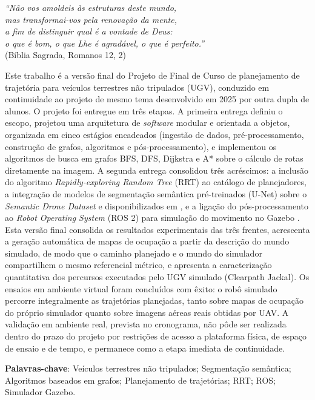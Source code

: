 \documentclass[
    12pt,
    openright,
    oneside,
    a4paper,
    english,
    brazil
]{abntex2}
\begin{document}
\begin{epigrafe}
    \vspace*{\fill}
    \begin{flushright}
        \textit{``Não vos amoldeis às estruturas deste mundo,\\
        mas transformai-vos pela renovação da mente,\\
        a fim de distinguir qual é a vontade de Deus:\\
        o que é bom, o que Lhe é agradável, o que é perfeito.''}\\
        (Bíblia Sagrada, Romanos 12, 2)
    \end{flushright}
\end{epigrafe}

\setlength{\absparsep}{18pt}
\begin{resumo}
Este trabalho é a versão final do Projeto de Final de Curso de planejamento de trajetória para veículos terrestres não tripulados (UGV), conduzido em continuidade ao projeto de mesmo tema desenvolvido em 2025 por outra dupla de alunos. O projeto foi entregue em três etapas. A primeira entrega definiu o escopo, projetou uma arquitetura de \textit{software} modular e orientada a objetos, organizada em cinco estágios encadeados (ingestão de dados, pré-processamento, construção de grafos, algoritmos e pós-processamento), e implementou os algoritmos de busca em grafos BFS, DFS, Dijkstra e A* sobre o cálculo de rotas diretamente na imagem. A segunda entrega consolidou três acréscimos: a inclusão do algoritmo \textit{Rapidly-exploring Random Tree} (RRT) ao catálogo de planejadores, a integração de modelos de segmentação semântica pré-treinados (U-Net) sobre o \textit{Semantic Drone Dataset} \cite{drone_dataset} e disponibilizados em \cite{junior2024_models}, e a ligação do pós-processamento ao \textit{Robot Operating System} (ROS 2) \cite{quigley2009} para simulação do movimento no Gazebo \cite{koenig2004}. Esta versão final consolida os resultados experimentais das três frentes, acrescenta a geração automática de mapas de ocupação a partir da descrição do mundo simulado, de modo que o caminho planejado e o mundo do simulador compartilhem o mesmo referencial métrico, e apresenta a caracterização quantitativa dos percursos executados pelo UGV simulado (Clearpath Jackal). Os ensaios em ambiente virtual foram concluídos com êxito: o robô simulado percorre integralmente as trajetórias planejadas, tanto sobre mapas de ocupação do próprio simulador quanto sobre imagens aéreas reais obtidas por UAV. A validação em ambiente real, prevista no cronograma, não pôde ser realizada dentro do prazo do projeto por restrições de acesso a plataforma física, de espaço de ensaio e de tempo, e permanece como a etapa imediata de continuidade.

\textbf{Palavras-chave}: Veículos terrestres não tripulados; Segmentação semântica; Algoritmos baseados em grafos; Planejamento de trajetórias; RRT; ROS; Simulador Gazebo.
\end{resumo}
\end{document}
